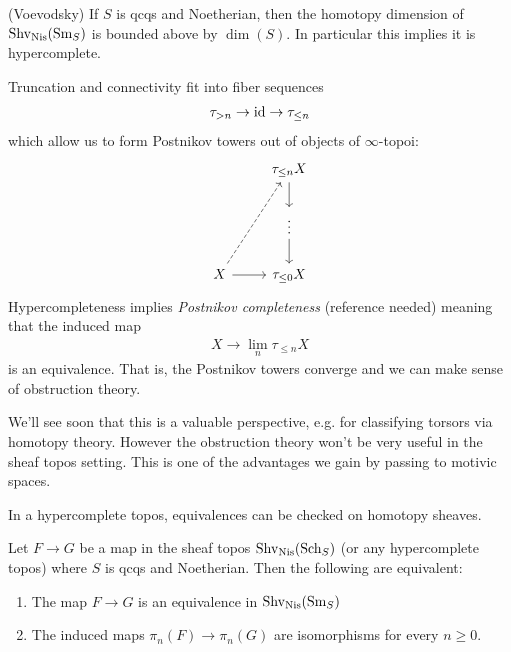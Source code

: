 \documentclass[11pt,openany]{book}
\begin{document}
\begin{theorem} (Voevodsky) If $S$ is qcqs and Noetherian, then the homotopy dimension of $\mathrm{Shv}_{\mathrm{Nis}}(\mathrm{Sm}_S)$ is bounded above by $\dim(S)$. In particular this implies it is hypercomplete.
\end{theorem}

Truncation and connectivity fit into fiber sequences
\begin{equation}\label{eqn:truncation-connectivity-fiber-seq}
\begin{aligned}
    \tau_{>n} \to \mathrm{id} \to \tau_{\le n}
\end{aligned}
\end{equation}
%
which allow us to form Postnikov towers out of objects of $\infty$-topoi:
\[ \begin{tikzcd}
    & \tau_{\le n }X\dar \\
    & \vdots\dar\\
    X\rar\ar[uur,dashed] & \tau_{\le 0} X
\end{tikzcd} \]
Hypercompleteness implies \textit{Postnikov completeness} (reference needed) meaning that the induced map
\begin{align*}
    X \to \lim_n \tau_{\le n} X
\end{align*}
is an equivalence. That is, the Postnikov towers converge and we can make sense of obstruction theory.

We'll see soon that this is a valuable perspective, e.g. for classifying torsors via homotopy theory. However the obstruction theory won't be very useful in the sheaf topos setting. This is one of the advantages we gain by passing to motivic spaces.

\begin{upshot} In a hypercomplete topos, equivalences can be checked on homotopy sheaves.
\end{upshot}

\begin{corollary}\label{cor:equivalence-in-hypercomplete-topos} 
Let $F \to G$ be a map in the sheaf topos $\mathrm{Shv}_{\mathrm{Nis}}(\mathrm{Sch}_S)$ (or any hypercomplete topos) where $S$ is qcqs and Noetherian. Then the following are equivalent:
\begin{enumerate}
    \item The map $F \to G$ is an equivalence in $\mathrm{Shv}_{\mathrm{Nis}}(\mathrm{Sm}_S)$
    \item The induced maps $\pi_n(F) \to \pi_n(G)$ are isomorphisms for every $n\ge 0$.
\end{enumerate}
\end{corollary}
\end{document}
